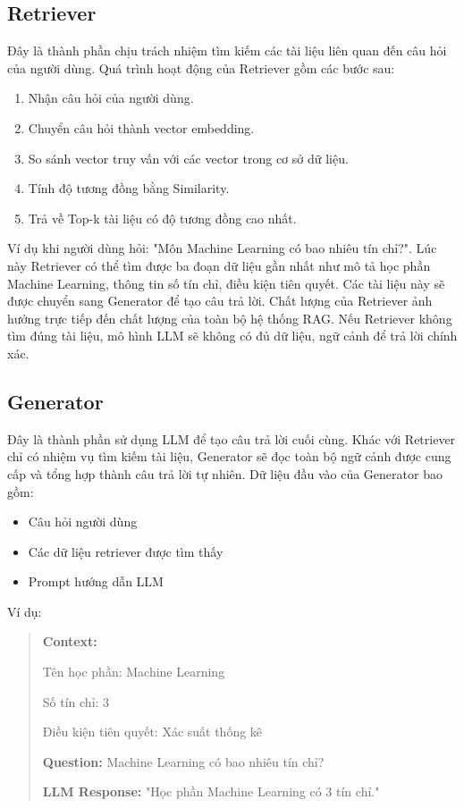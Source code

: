 \documentclass[../DoAn.tex]{subfiles}
\begin{document}
\subsection{Retriever}
Đây là thành phần chịu trách nhiệm tìm kiếm các tài liệu liên quan đến câu hỏi của người dùng.
Quá trình hoạt động của Retriever gồm các bước sau:
\begin{enumerate}[label=\textbf{Bước \arabic*.}, leftmargin=*]
    \item Nhận câu hỏi của người dùng.
    \item Chuyển câu hỏi thành vector embedding.
    \item So sánh vector truy vấn với các vector trong cơ sở dữ liệu.
    \item Tính độ tương đồng bằng Similarity.
    \item Trả về Top-k tài liệu có độ tương đồng cao nhất.
\end{enumerate}
Ví dụ khi người dùng hỏi: "Môn Machine Learning có bao nhiêu tín chỉ?". Lúc này Retriever có thể tìm được ba đoạn dữ liệu gần nhất như mô tả học phần Machine Learning, thông tin số tín chỉ, điều kiện tiên quyết. Các tài liệu này sẽ được chuyển sang Generator để tạo câu trả lời. Chất lượng của Retriever ảnh hưởng trực tiếp đến chất lượng của toàn bộ hệ thống RAG. Nếu Retriever không tìm đúng tài liệu, mô hình LLM sẽ không có đủ dữ liệu, ngữ cảnh để trả lời chính xác.

\subsection{Generator}
Đây là thành phần sử dụng LLM để tạo câu trả lời cuối cùng. Khác với Retriever chỉ có nhiệm vụ tìm kiếm tài liệu, Generator sẽ đọc toàn bộ ngữ cảnh được cung cấp và tổng hợp thành câu trả lời tự nhiên.
Dữ liệu đầu vào của Generator bao gồm:
\begin{itemize}
    \item Câu hỏi người dùng
    \item Các dữ liệu retriever được tìm thấy
    \item Prompt hướng dẫn LLM
\end{itemize}
Ví dụ:

\begin{quote}
    \textbf{Context:}

    Tên học phần: Machine Learning

    Số tín chỉ: 3

    Điều kiện tiên quyết: Xác suất thống kê

    \vspace{0.5em}

    \textbf{Question:}
    Machine Learning có bao nhiêu tín chỉ?

    \vspace{0.5em}

    \textbf{LLM Response:}
    "Học phần Machine Learning có 3 tín chỉ."
\end{quote}
\end{document}
